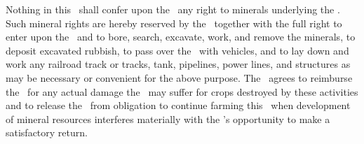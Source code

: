 Nothing in this \amendmentTitle\ shall confer upon the \lessee\ any right to minerals underlying the \property. Such mineral rights are hereby reserved by the \lessor\ together with the full right to enter upon the \property\ and to bore, search, excavate, work, and remove the minerals, to deposit excavated rubbish, to pass over the \property\ with vehicles, and to lay down and work any railroad track or tracks, tank, pipelines, power lines, and structures as may be necessary or convenient for the above purpose. The \lessor\ agrees to reimburse the \lessee\ for any actual damage the \lessee\ may suffer for crops destroyed by these activities and to release the \lessee\ from obligation to continue farming this \property\ when development of mineral resources interferes materially with the \lessee’s opportunity to make a satisfactory return.
